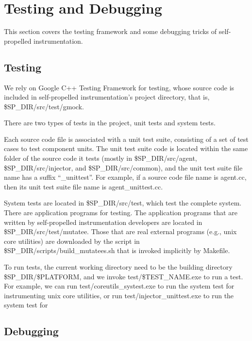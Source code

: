 \section{Testing and Debugging}
This section covers the testing framework and some debugging tricks of
self-propelled instrumentation.
\subsection{Testing}
We rely on Google C++ Testing Framework for testing, whose source code is
included in self-propelled instrumentation's project directory, that is,
\$SP\_DIR/src/test/gmock.

There are two types of tests in the project, unit tests and system tests.

Each source code file is associated with a unit test suite, consisting of a set
of test cases to test component units.
The unit test suite code is located within the same folder of the source code it
tests (mostly in \$SP\_DIR/src/agent, \$SP\_DIR/src/injector, and
\$SP\_DIR/src/common), and the unit test suite file name has a suffix
``_unittest''.
For example, if a source code file name is agent.cc, then its unit test suite
file name is agent_unittest.cc.

System tests are located in \$SP\_DIR/src/test, which test the complete system.
There are application programs for testing.
The application programs that are written by self-propelled instrumentation
developers are located in \$SP\_DIR/src/test/mutatee.
Those that are real external programs (e.g., unix core utilities) are downloaded
by the script in \$SP\_DIR/scripts/build_mutatees.sh that is invoked implicitly
by Makefile.

To run tests, the current working directory need to be the building directory
\$SP\_DIR/\$PLATFORM, and we invoke test/\$TEST_NAME.exe to run a test.
For example, we can run test/coreutils_systest.exe to run the system test for
instrumenting unix core utilities, or run test/injector_unittest.exe to run the system test for 

\subsection{Debugging}

